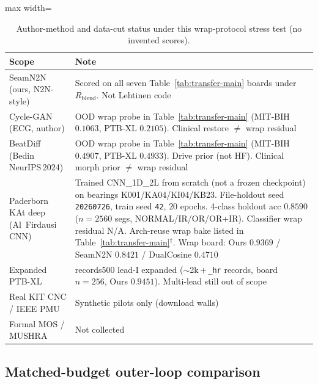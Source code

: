 \begin{table}[htbp]
  \centering
  \caption{Author-method and data-cut status under this wrap-protocol stress test (no invented scores).}
  \label{tab:transfer-sota-status}
  \setlength{\tabcolsep}{3pt}
  \begin{adjustbox}{max width=\columnwidth}
\begin{tabular}{@{}lp{}@{}}
    \toprule
    Scope & Note \\
    \midrule
    SeamN2N (ours, N2N-style) & Scored on all seven Table~\ref{tab:transfer-main} boards
      under $R_{\mathrm{blend}}$. Not Lehtinen code \\
    Cycle-GAN (ECG, author) & OOD wrap probe in Table~\ref{tab:transfer-main}
      (MIT-BIH $0.1063$, PTB-XL $0.2105$). Clinical restore $\neq$ wrap residual \\
    BeatDiff (Bedin NeurIPS\,2024) & OOD wrap probe in Table~\ref{tab:transfer-main}
      (MIT-BIH $0.4907$, PTB-XL $0.4933$). Drive prior (not HF).
      Clinical morph prior $\neq$ wrap residual \\
    Paderborn KAt deep (Al~Firdausi CNN) & Trained CNN\_1D\_2L from scratch (not a frozen
      checkpoint) on bearings K001/KA04/KI04/KB23. File-holdout seed \texttt{20260726},
      train seed \texttt{42}, $20$ epochs. 4-class holdout acc $0.8590$ ($n{=}2560$ segs,
      NORMAL/IR/OR/OR+IR). Classifier wrap residual N/A. Arch-reuse wrap bake listed
      in Table~\ref{tab:transfer-main}$^\dagger$.
      Wrap board: Ours $0.9369$ / SeamN2N $0.8421$ / DualCosine $0.4710$ \\
    Expanded PTB-XL & records500 lead-I expanded ($\sim$2k\,$+$\,\texttt{\_hr} records, board $n{=}256$,
      Ours $0.9451$). Multi-lead still out of scope \\
    Real KIT CNC / IEEE PMU & Synthetic pilots only (download walls) \\
    Formal MOS / MUSHRA & Not collected \\
    \bottomrule
  \end{tabular}
\end{adjustbox}
\end{table}

\subsection{Matched-budget outer-loop comparison}
\label{sec:meta-approaches-results}

